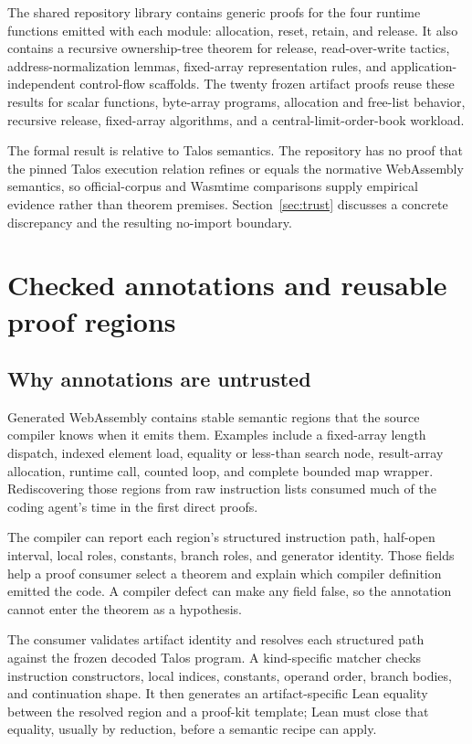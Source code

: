 \documentclass[11pt]{article}
\begin{document}
The shared repository library contains generic proofs for the four runtime functions emitted with each module: allocation, reset, retain, and release.  It also contains a recursive ownership-tree theorem for release, read-over-write tactics, address-normalization lemmas, fixed-array representation rules, and application-independent control-flow scaffolds.  The twenty frozen artifact proofs reuse these results for scalar functions, byte-array programs, allocation and free-list behavior, recursive release, fixed-array algorithms, and a central-limit-order-book workload.

The formal result is relative to Talos semantics.  The repository has no proof that the pinned Talos execution relation refines or equals the normative WebAssembly semantics, so official-corpus and Wasmtime comparisons supply empirical evidence rather than theorem premises.  Section~\ref{sec:trust} discusses a concrete discrepancy and the resulting no-import boundary.

\section{Checked annotations and reusable proof regions}

\subsection{Why annotations are untrusted}

Generated WebAssembly contains stable semantic regions that the source compiler knows when it emits them.  Examples include a fixed-array length dispatch, indexed element load, equality or less-than search node, result-array allocation, runtime call, counted loop, and complete bounded map wrapper.  Rediscovering those regions from raw instruction lists consumed much of the coding agent's time in the first direct proofs.

The compiler can report each region's structured instruction path, half-open interval, local roles, constants, branch roles, and generator identity.  Those fields help a proof consumer select a theorem and explain which compiler definition emitted the code.  A compiler defect can make any field false, so the annotation cannot enter the theorem as a hypothesis.

The consumer validates artifact identity and resolves each structured path against the frozen decoded Talos program.  A kind-specific matcher checks instruction constructors, local indices, constants, operand order, branch bodies, and continuation shape.  It then generates an artifact-specific Lean equality between the resolved region and a proof-kit template; Lean must close that equality, usually by reduction, before a semantic recipe can apply.
\end{document}
